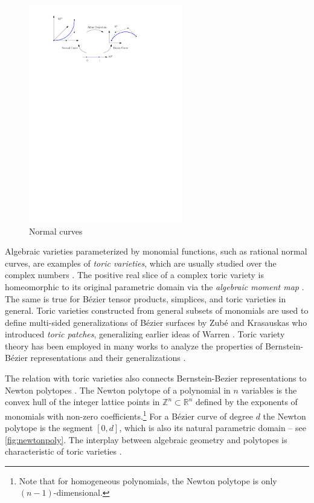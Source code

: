 \documentclass[12pt,final,3p]{elsarticle}
\begin{document}
\begin{figure}[h]
	\centering
	\includegraphics[width=0.6\textwidth, keepaspectratio]{figures/normalcurve.pdf}
	\caption{Normal curves}
	\label{fig:normalcurve}
\end{figure}

Algebraic varieties parameterized by monomial functions, such as rational normal curves, are examples of \emph{toric varieties}, which are usually studied over the complex numbers \cite{danilov1978geometry,cox2003what,cox2011toric}. The positive real slice of a complex toric variety is homeomorphic to its original parametric domain via the \emph{algebraic moment map} \cite{sottile2003toric}. The same is true for B\'{e}zier tensor products, simplices, and toric varieties in general. Toric varieties constructed from general subsets of monomials are used to define multi-sided generalizations of B\'{e}zier surfaces by Zub\'{e} and Krasauskas \cite{zub2000n,krasauskas2001shape,krasauskas2002toric} who introduced \emph{toric patches}, generalizing earlier ideas of Warren \cite{warren1992creating,warren1994multi,warren1994bound}. Toric variety theory has been employed in many works to analyze the properties of Bernstein-B\'{e}zier representations and their generalizations \cite{karciauskas1999comparison,cox2003universal,krasauskas2005universal,krasauskas2006bezier,craciun2010some,garcia2010linear,sottile2011injectivity,garc2011toric,sun2015g1}.

The relation with toric varieties also connects Bernstein-Bezier representations to Newton polytopes \cite{khovanskii1992newton,atiyah1983angular}. The Newton polytope of a polynomial in $n$ variables is the convex hull of the integer lattice points in $\mathbb{Z}^{n} \subset \mathbb{R}^{n}$ defined by the exponents of monomials with non-zero coefficients.\footnote{Note that for homogeneous polynomials, the Newton polytope is only $(n-1)$-dimensional.} For a B\'{e}zier curve of degree $d$ the Newton polytope is the segment $[0,d]$, which is also its natural parametric domain  -- see \autoref{fig:newtonpoly}.  The interplay between algebraic geometry and polytopes is characteristic of toric varieties \cite{ewald1996combinatorial}.
\end{document}
